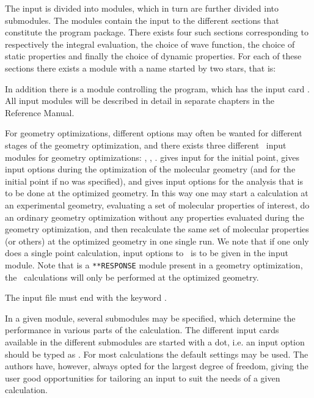 The input is divided into modules, which in turn are
further divided into submodules. The modules contain
the input to the different
sections that constitute the {\dalton} program package. There exists
four such sections corresponding to respectively the integral
evaluation, the choice of wave function, the
choice of static properties and finally
the choice of dynamic properties. For each of
these sections there exists a module with a name started by two stars,
that is:

\begin{list}{}{}
\item {}
\item {}
\item {}
\item {}
\end{list}

In addition there is a module controlling the {\dalton} program, which
has the input card . All
input modules will be described in detail in separate chapters in the
Reference Manual.

For geometry optimizations,
different options may often be wanted for different stages of the
geometry optimization, and there exists three different \aba\ input
modules for geometry optimizations: , ,
.  gives input for the initial point,
 gives input options during the optimization of the
molecular geometry
(and for the initial point if no  was specified),
and  gives input options for the
analysis that is to be done at the optimized geometry. In this way one
may start a calculation at an experimental geometry, evaluating a set
of molecular properties of interest, do an ordinary geometry
optimization without any properties evaluated during the geometry
optimization, and then recalculate the same set of molecular
properties (or others) at the optimized geometry in one single run. We
note that if one only does a single point calculation, input
options to \aba\ is to be given in the  input module.
Note that is a \verb|**RESPONSE| module present in a geometry optimization,
the \resp\ calculations will only be performed at the optimized geometry.

The input file must end with the keyword .

In a given module, several submodules may be
specified, which determine the performance in various parts of the
calculation. The different input cards available
in the different submodules are started with a dot, i.e. an input
option should be typed as . For most calculations the
default settings may be used. The authors have, however, always
opted for the largest degree of freedom, giving the user good
opportunities for tailoring an input to suit the needs of a given
calculation.

